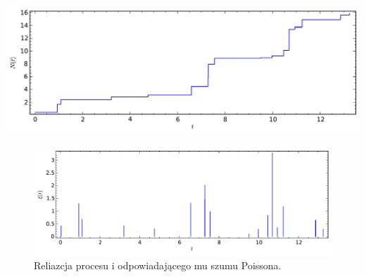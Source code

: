 \documentclass[a4paper,12pt,polish]{sphinxmanual}
\begin{document}
{\hfill\includegraphics[width=0.800\linewidth]{sage_chIII03_01a.pdf}\hfill}
\begin{figure}[htbp]
\centering
\capstart

\includegraphics[width=0.800\linewidth]{sage_chIII03_01b.pdf}
\caption{Reliazcja procesu i odpowiadającego mu szumu Poissona.}\end{figure}
\end{document}
